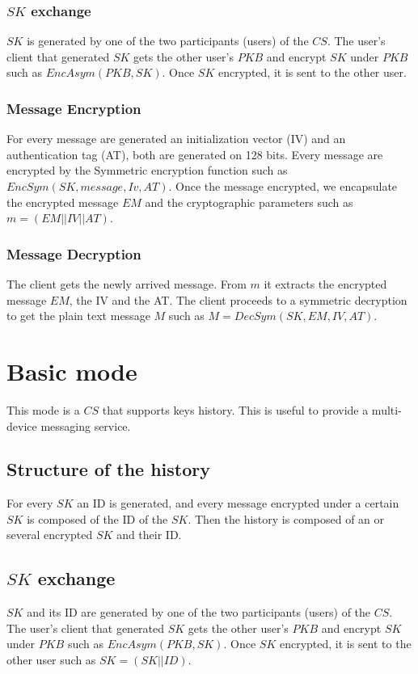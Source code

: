 \documentclass[a4paper,10pt]{article}
\begin{document}
\subsubsection{$SK$ exchange}
$SK$ is generated by one of the two participants (users) of the $CS$. The user's client that generated $SK$ gets the other user's $PKB$ and encrypt $SK$ under $PKB$ such as $EncAsym(PKB, SK)$. Once $SK$ encrypted, it is sent to the other user.
\subsubsection{Message Encryption}
For every message are generated an initialization vector (IV) and an authentication tag (AT), both are generated on 128 bits. Every message are encrypted by the Symmetric encryption function such as $EncSym(SK,message,Iv, AT)$. Once the message encrypted, we encapsulate the encrypted message $EM$ and the cryptographic parameters such as $m=(EM||IV||AT)$.

\subsubsection{Message Decryption}
The client gets the newly arrived message. From $m$ it extracts the encrypted message $EM$, the IV and the AT. The client proceeds to a symmetric decryption to get the plain text message $M$ such as $M=DecSym(SK, EM, IV, AT)$.

\section{Basic mode}
This mode is a $CS$ that supports keys history. This is useful to provide a multi-device messaging service.
\subsection{Structure of the history}
For every $SK$ an ID is generated, and every message encrypted under a certain $SK$ is composed of the ID of the $SK$. Then the history is composed of an or several encrypted $SK$ and their ID.
\subsection{$SK$ exchange}
$SK$ and its ID are generated by one of the two participants (users) of the $CS$. The user's client that generated $SK$ gets the other user's $PKB$ and encrypt $SK$ under $PKB$ such as $EncAsym(PKB, SK)$. Once $SK$ encrypted, it is sent to the other user such as $SK=(SK||ID)$.
\end{document}
